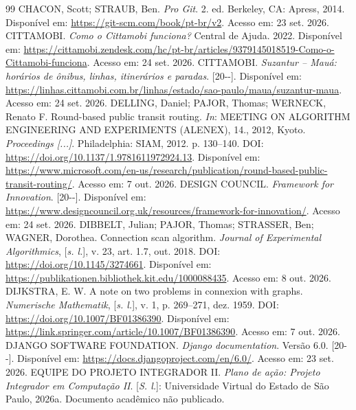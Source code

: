 \documentclass[12pt,oneside,a4paper,brazil,chapter=TITLE]{abntex2}
\begin{document}
\begin{thebibliography}{99}
 CHACON, Scott; STRAUB, Ben. \textit{Pro Git}. 2. ed. Berkeley, CA: Apress, 2014. Disponível em: \url{https://git-scm.com/book/pt-br/v2}. Acesso em: 23 set. 2026.
 CITTAMOBI. \textit{Como o Cittamobi funciona?} Central de Ajuda. 2022. Disponível em: \url{https://cittamobi.zendesk.com/hc/pt-br/articles/9379145018519-Como-o-Cittamobi-funciona}. Acesso em: 24 set. 2026.
 CITTAMOBI. \textit{Suzantur -- Mauá: horários de ônibus, linhas, itinerários e paradas}. [20\mbox{-}\mbox{-}]. Disponível em: \url{https://linhas.cittamobi.com.br/linhas/estado/sao-paulo/maua/suzantur-maua}. Acesso em: 24 set. 2026.
 DELLING, Daniel; PAJOR, Thomas; WERNECK, Renato F. Round-based public transit routing. \textit{In}: MEETING ON ALGORITHM ENGINEERING AND EXPERIMENTS (ALENEX), 14., 2012, Kyoto. \textit{Proceedings [...]}. Philadelphia: SIAM, 2012. p. 130--140. DOI: \url{https://doi.org/10.1137/1.9781611972924.13}. Disponível em: \url{https://www.microsoft.com/en-us/research/publication/round-based-public-transit-routing/}. Acesso em: 7 out. 2026.
 DESIGN COUNCIL. \textit{Framework for Innovation}. [20\mbox{-}\mbox{-}]. Disponível em: \url{https://www.designcouncil.org.uk/resources/framework-for-innovation/}. Acesso em: 24 set. 2026.
 DIBBELT, Julian; PAJOR, Thomas; STRASSER, Ben; WAGNER, Dorothea. Connection scan algorithm. \textit{Journal of Experimental Algorithmics}, [\textit{s. l.}], v. 23, art. 1.7, out. 2018. DOI: \url{https://doi.org/10.1145/3274661}. Disponível em: \url{https://publikationen.bibliothek.kit.edu/1000088435}. Acesso em: 8 out. 2026.
 DIJKSTRA, E. W. A note on two problems in connexion with graphs. \textit{Numerische Mathematik}, [\textit{s. l.}], v. 1, p. 269--271, dez. 1959. DOI: \url{https://doi.org/10.1007/BF01386390}. Disponível em: \url{https://link.springer.com/article/10.1007/BF01386390}. Acesso em: 7 out. 2026.
 DJANGO SOFTWARE FOUNDATION. \textit{Django documentation}. Versão 6.0. [20\mbox{-}\mbox{-}]. Disponível em: \url{https://docs.djangoproject.com/en/6.0/}. Acesso em: 23 set. 2026.
 EQUIPE DO PROJETO INTEGRADOR II. \textit{Plano de ação: Projeto Integrador em Computação II}. [\textit{S. l.}]: Universidade Virtual do Estado de São Paulo, 2026a. Documento acadêmico não publicado.

\end{thebibliography}
\end{document}
